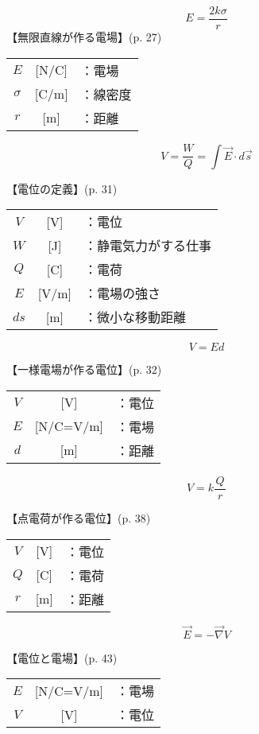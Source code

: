 \documentclass[10pt]{jarticle}
\begin{document}
\newpage
\[
E = \frac{2k \sigma}{r}
\]
\vskip3mm
【無限直線が作る電場】{\footnotesize (p. 27)}

\begin{tabular}{ccl}
$E$	&[N/C]	&：電場 \\
$\sigma$	&[C/m]	&：線密度\\
$r$	&[m]	&：距離
\end{tabular}




\newpage
\[
V = \frac{W}{Q} = \int \vec{E} \cdot d\vec{s}
\]


\vskip3mm
【電位の定義】{\footnotesize (p. 31)}

\begin{tabular}{ccl}
$V$	&[V]	&：電位 \\
$W$	&[J]	&：{\small 静電気力がする仕事} \\
$Q$	&[C]	&：電荷\\
$E$	&[V/m]	&：電場の強さ\\
$ds$	&[m]	&：微小な移動距離\\
\end{tabular}




\newpage
\[
V = E d
\]


\vskip3mm
【一様電場が作る電位】{\footnotesize (p. 32)}

\begin{tabular}{ccl}
$V$	&[V]	&：電位 \\
$E$	&[N/C=V/m]	&：電場 \\
$d$	&[m]	&：距離
\end{tabular}





\newpage
\[
V = k \frac{Q}{\; r \;}
\]


\vskip3mm
【点電荷が作る電位】{\footnotesize (p. 38)}

\begin{tabular}{ccl}
$V$	&[V]	&：電位 \\
$Q$	&[C]	&：電荷 \\
$r$	&[m]	&：距離
\end{tabular}



\newpage
\[
\vec{E} = - \vec{\nabla} V
\]


\vskip3mm
【電位と電場】{\footnotesize (p. 43)}

\begin{tabular}{ccl}
$E$	&[N/C=V/m]	&：電場 \\
$V$	&[V]	&：電位
\end{tabular}
\end{document}
